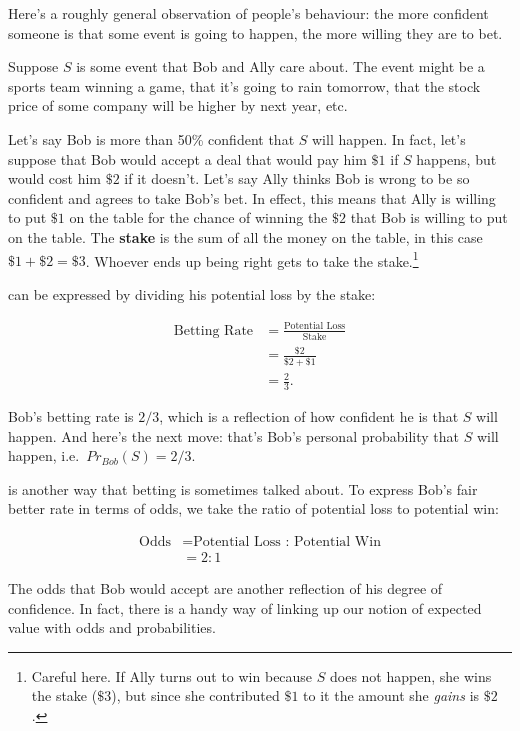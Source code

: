 \documentclass[]{tufte-book}
\begin{document}
Here's a roughly general observation of people's behaviour: the more confident someone is that some event is going to happen, the more willing they are to bet.

Suppose \(S\) is some event that Bob and Ally care about. The event might be a sports team winning a game, that it's going to rain tomorrow, that the stock price of some company will be higher by next year, etc.

Let's say Bob is more than 50\% confident that \(S\) will happen. In fact, let's suppose that Bob would accept a deal that would pay him \(\$1\) if \(S\) happens, but would cost him \(\$2\) if it doesn't. Let's say Ally thinks Bob is wrong to be so confident and agrees to take Bob's bet. In effect, this means that Ally is willing to put \(\$1\) on the table for the chance of winning the \(\$2\) that Bob is willing to put on the table. The \textbf{stake} is the sum of all the money on the table, in this case \(\$1 + \$2 = \$3\). Whoever ends up being right gets to take the stake.\footnote{Careful here. If Ally turns out to win because \(S\) does not happen, she wins the stake (\(\$3\)), but since she contributed \(\$1\) to it the amount she \emph{gains} is \(\$2\).}

 can be expressed by dividing his potential loss by the stake:

\[
  \begin{aligned}
    \mbox{Betting Rate} &= \frac{\mbox{Potential Loss}}{\mbox{Stake}}\\
                        &= \frac{\$2}{\$2 + \$1}\\
                        &= \frac{2}{3}.
  \end{aligned}
\]

Bob's betting rate is \(2/3\), which is a reflection of how confident he is that \(S\) will happen. And here's the next move: that's Bob's personal probability that \(S\) will happen, i.e.~\(Pr_{Bob}(S)=2/3\).

 is another way that betting is sometimes talked about. To express Bob's fair better rate in terms of odds, we take the ratio of potential loss to potential win:

\[
  \begin{aligned}
    \mbox{Odds} &= \mbox{Potential Loss : Potential Win}\\
                &=  2:1
  \end{aligned}
\]

The odds that Bob would accept are another reflection of his degree of confidence. In fact, there is a handy way of linking up our notion of expected value with odds and probabilities.
\end{document}
